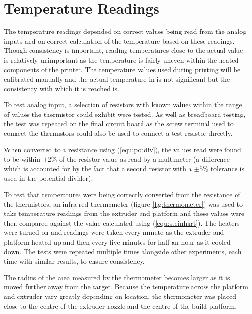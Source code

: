 	
	\section{Temperature Readings}
		
		The temperature readings depended on correct values being read from the
		analog inputs and on correct calculation of the temperature based on these
		readings. Though consistency is important, reading temperatures close to the
		actual value is relatively unimportant as the temperature is fairly uneven
		within the heated components of the printer. The temperature values used
		during printing will be calibrated manually and the actual temperature in
		\dC{} is not significant but the consistency with which it is reached is.
		
		To test analog input, a selection of resistors with known values within the
		range of values the thermistor could exhibit were tested. As well as
		breadboard testing, the test was repeated on the final circuit board as the
		screw terminal used to connect the thermistors could also be used to connect
		a test resistor directly.
		
		When converted to a resistance using (\ref{equ:potdiv}), the values read
		were found to be within $\pm2\%$ of the resistor value as read by a
		multimeter (a difference which is accounted for by the fact that a second
		resistor with a $\pm5\%$ tolerance is used in the potential divider).
		
		To test that temperatures were being correctly converted from the resistance
		of the thermistors, an infra-red thermometer (figure \ref{fig:thermometer})
		was used to take temperature readings from the extruder and platform and
		these values were then compared against the value calculated using
		(\ref{equ:steinhart}). The heaters were turned on and readings were taken
		every minute as the extruder and platform heated up and then every five
		minutes for half an hour as it cooled down. The tests were repeated multiple
		times alongside other experiments, each time with similar results, to ensure
		consistency.
		
		The radius of the area measured by the thermometer becomes larger as it is
		moved further away from the target. Because the temperature across the
		platform and extruder vary greatly depending on location, the thermometer
		was placed close to the centre of the extruder nozzle and the centre of the
		build platform.
		
